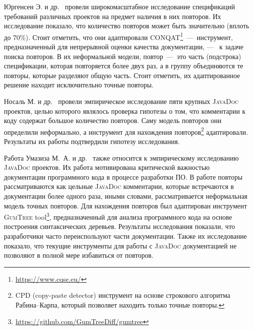 Юргенсен Э. и др.~\cite{juergens2010can} провели широкомасштабное исследование спецификаций требований различных проектов на предмет наличия в них повторов. 
Их исследование показало, что количество повторов может быть значительно (вплоть до 70\%). 
Стоит отметить, что они адаптировали \textsc{CONQAT}\footnote{\url{https://www.cqse.eu/}}~---~инструмент, предназначенный для непрерывной оценки качества документации, ---~ к задаче поиска повторов.
В их неформальной модели, повтор~---~это часть (подстрока) спецификации, которая повторяется более двух раз, а в группу объединяются те повторы, которые разделяют общую часть.
Стоит отметить, их адаптированное решение находит исключительно точные повторы.

Носаль М. и др.~\cite{poruban2016preliminary} провели эмпирическое исследование пяти крупных \textsc{JavaDoc} проектов, целью которого являлось проверка гипотезы о том, что комментарии к коду содержат большое количество повторов.
Саму модель повторов они определили неформально, а инструмент для нахождения повторов\footnote{\textsc{CPD} (copy-paste detector) инструмент на основе строкового алгоритма Рабина--Карпа, который позволяет находить только точные повторы.} адаптировали.
Результаты их работы подтвердили гипотезу исследования. 

Работа Умазиза М.\, А. и др.~\cite{oumaziz2017documentation} также относится к эмпирическому исследованию \textsc{JavaDoc} проектов. 
Их работа мотивирована критической важностью документации программного кода в процессе разработки ПО.
В работе повторы рассматриваются как цельные \textsc{JavaDoc} комментарии, которые встречаются в документации более одного раза, иными словами, рассматривается неформальная модель точных повторов.
Для нахождения повторов был адаптирован инструмент \textsc{GumTree} tool\footnote{\url{https://github.com/GumTreeDiff/gumtree}}, предназначенный для анализа программного кода на основе построения синтаксических деревьев.
Результаты исследования показали, что разработчики часто переиспользуют части документации.
Также их исследование показало, что текущие инструменты для работы с \textsc{JavaDoc} документацией не позволяют в полной мере избавиться от повторов.


